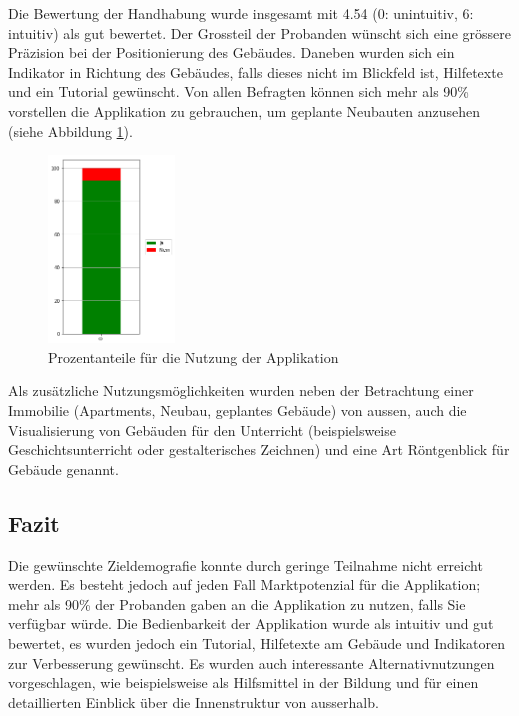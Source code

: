 \documentclass[a4paper]{scrreprt}
\begin{document}
Die Bewertung der Handhabung wurde insgesamt mit 4.54 (0: unintuitiv, 6: intuitiv) als gut bewertet. Der Grossteil der Probanden wünscht sich eine grössere Präzision bei der Positionierung des Gebäudes. Daneben wurden sich ein Indikator in Richtung des Gebäudes, falls dieses nicht im Blickfeld ist, Hilfetexte und ein Tutorial gewünscht. Von allen Befragten können sich mehr als 90\% vorstellen die Applikation zu gebrauchen, um geplante Neubauten anzusehen (siehe Abbildung \ref{fig:Nutzung}).

\begin{figure}[htb]
	\centering
	\includegraphics[keepaspectratio, width=0.3\textwidth]{Nutzung.png}
	\caption{Prozentanteile für die Nutzung der Applikation}
	\label{fig:Nutzung}
\end{figure}

Als zusätzliche Nutzungsmöglichkeiten wurden neben der Betrachtung einer Immobilie (Apartments, Neubau, geplantes Gebäude) von aussen, auch die Visualisierung von Gebäuden für den Unterricht (beispielsweise Geschichtsunterricht oder gestalterisches Zeichnen) und eine Art Röntgenblick für Gebäude genannt.

\subsection{Fazit}
Die gewünschte Zieldemografie konnte durch geringe Teilnahme nicht erreicht werden. Es besteht jedoch auf jeden Fall Marktpotenzial für die Applikation; mehr als 90\% der Probanden gaben an die Applikation zu nutzen, falls Sie verfügbar würde. Die Bedienbarkeit der Applikation wurde als intuitiv und gut bewertet, es wurden jedoch ein Tutorial, Hilfetexte am Gebäude und Indikatoren zur Verbesserung gewünscht. Es wurden auch interessante Alternativnutzungen vorgeschlagen, wie beispielsweise als Hilfsmittel in der Bildung und für einen detaillierten Einblick über die Innenstruktur von ausserhalb.
\end{document}
